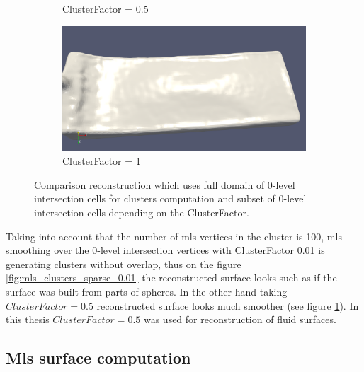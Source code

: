 \begin{figure}[H]
\begin{center}
\begin{subfigure}[b]{0.46\textwidth}
			\caption{ClusterFactor = 0.5} \label{fig:mls_clusters_sparse_0.5}
		\end{subfigure}
		\begin{subfigure}[b]{0.46\textwidth}
			\includegraphics[width=\textwidth]{figures/MlsSparseClusters1.png}
			\caption{ClusterFactor = 1} \label{fig:mls_clusters_sparse_1}
		\end{subfigure}

	\end{center}
	\caption{Comparison reconstruction which uses full domain of 0-level intersection cells for clusters computation and subset of 0-level intersection cells depending on the ClusterFactor.} \label{fig:mls_sparse_clusters_reconstruction}
\end{figure} 
Taking into account that the number of mls vertices in the cluster is 100, mls smoothing over the 0-level intersection vertices with ClusterFactor 0.01 is generating clusters without overlap, thus on the figure \ref{fig:mls_clusters_sparse_0.01} the reconstructed surface looks such as if the surface was built from parts of spheres. In the other hand taking $ClusterFactor = 0.5$ reconstructed surface looks much smoother (see figure \ref{fig:mls_clusters_sparse_0.5}). In this thesis $ClusterFactor = 0.5$ was used for reconstruction of fluid surfaces. 

\subsection{Mls surface computation}

